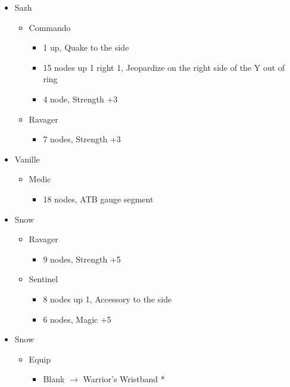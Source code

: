 \documentclass{report}
\begin{document}
\begin{menu}
\begin{itemize}
    \crystarium
    \begin{itemize}
        \item Sazh
        \begin{itemize}
            \item Commando
            \begin{itemize}
                \item 1 up, Quake to the side
                \item 15 nodes up 1 right 1, Jeopardize on the right side of the Y out of ring
                \item 4 node, Strength +3
            \end{itemize}
            \item Ravager
            \begin{itemize}
                \item 7 nodes, Strength +3
            \end{itemize}
        \end{itemize}
        \item Vanille
        \begin{itemize}
            \item Medic
            \begin{itemize}
                \item 18 nodes, ATB gauge segment
            \end{itemize}
        \end{itemize}
        \item Snow
        \begin{itemize}
            \item Ravager
            \begin{itemize}
                \item 9 nodes, Strength +5
            \end{itemize}
            \item Sentinel
            \begin{itemize}
                \item 8 nodes up 1, Accessory to the side
                \item 6 nodes, Magic +5
            \end{itemize}
        \end{itemize}
    \end{itemize}
    \equip
    \begin{itemize}
        \item Snow
        \begin{itemize}
            \item Equip
            \begin{itemize}
                \item Blank $\rightarrow$ Warrior's Wristband *
            \end{itemize}
        \end{itemize}
    \end{itemize}
\end{itemize}
\end{menu}
\end{document}

